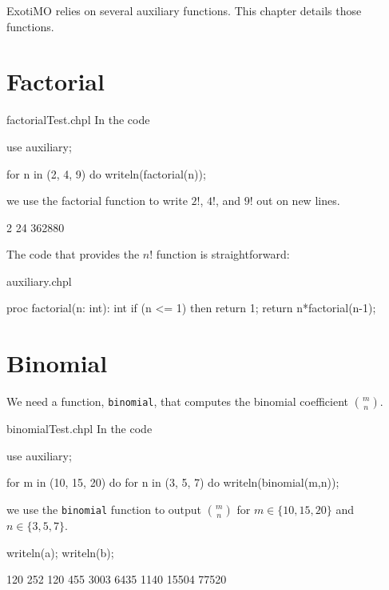 \label{Auxiliary_Functions}

ExotiMO relies on several auxiliary functions. This chapter details those functions.

\section{Factorial}

\begin{chapelexample}{factorialTest.chpl}
In the code
\begin{chapelpre}
use auxiliary;
\end{chapelpre}
\begin{chapel}
for n in (2, 4, 9) do
  writeln(factorial(n));
\end{chapel}
we use the factorial function to write $2!$, $4!$, and $9!$ out on new lines.
\begin{chapelpost}
\end{chapelpost}
\begin{chapeloutput}
2
24
362880
\end{chapeloutput}
\end{chapelexample}

The code that provides the $n!$ function is straightforward:
\begin{chapelsource}{auxiliary.chpl}
\begin{chapel}
proc factorial(n: int): int{
  if (n <= 1) then return 1;
  return n*factorial(n-1);
}
\end{chapel}
\end{chapelsource}

\section{Binomial}

We need a function, \lstinline{binomial}, that computes the binomial coefficient $\binom{m}{n}$.
\begin{chapelexample}{binomialTest.chpl}
In the code
\begin{chapelpre}
use auxiliary;
\end{chapelpre}
\begin{chapel}
for m in (10, 15, 20) do {
  for n in (3, 5, 7) do {
    writeln(binomial(m,n));
  }
}
\end{chapel}
we use the \lstinline{binomial} function to output $\binom{m}{n}$ 
for $m\in\{10, 15, 20\}$ and $n \in \{3, 5, 7\}$.
\begin{chapelpost}
writeln(a);
writeln(b);
\end{chapelpost}
\begin{chapeloutput}
120
252
120
455
3003
6435
1140
15504
77520
\end{chapeloutput}
\end{chapelexample}

